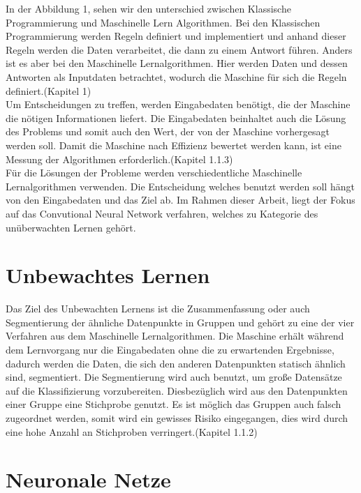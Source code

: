 \documentclass[12pt,titlepage]{article}
\begin{document}
In der Abbildung 1, sehen wir den unterschied zwischen Klassische Programmierung und Maschinelle Lern Algorithmen. Bei den Klassischen Programmierung werden Regeln definiert und implementiert und anhand dieser Regeln werden die Daten verarbeitet, die dann zu einem Antwort führen. Anders ist es aber bei den Maschinelle Lernalgorithmen. Hier werden Daten und dessen Antworten als Inputdaten betrachtet, wodurch die Maschine für sich die Regeln definiert.\cite{Chollet2018}(Kapitel 1)\\

Um Entscheidungen zu treffen, werden Eingabedaten benötigt, die der Maschine die nötigen Informationen liefert. Die Eingabedaten beinhaltet auch die Lösung des Problems und somit auch den Wert, der von der Maschine vorhergesagt werden soll. Damit die Maschine nach Effizienz bewertet werden kann, ist eine Messung der Algorithmen erforderlich.\cite{Chollet2018}(Kapitel 1.1.3)\\

Für die Lösungen der Probleme werden verschiedentliche Maschinelle Lernalgorithmen verwenden. Die Entscheidung welches benutzt werden soll hängt von den Eingabedaten und das Ziel ab. Im Rahmen dieser Arbeit, liegt der Fokus auf das Convutional Neural Network verfahren, welches zu Kategorie des unüberwachten Lernen gehört.\\

\section{Unbewachtes Lernen}
Das Ziel des Unbewachten Lernens ist die Zusammenfassung oder auch Segmentierung der ähnliche Datenpunkte in Gruppen und gehört zu eine der vier Verfahren aus dem Maschinelle Lernalgorithmen. Die Maschine erhält während dem Lernvorgang nur die Eingabedaten ohne die zu erwartenden Ergebnisse, dadurch werden die Daten, die sich den anderen Datenpunkten statisch ähnlich sind, segmentiert. Die Segmentierung wird auch benutzt, um große Datensätze auf die Klassifizierung vorzubereiten. Diesbezüglich wird aus den Datenpunkten einer Gruppe eine Stichprobe genutzt. Es ist möglich das Gruppen auch falsch zugeordnet werden, somit wird ein gewisses Risiko eingegangen, dies wird durch eine hohe Anzahl an Stichproben verringert.\cite{Matzka2021}(Kapitel 1.1.2)\\

\section{Neuronale Netze}
\end{document}
